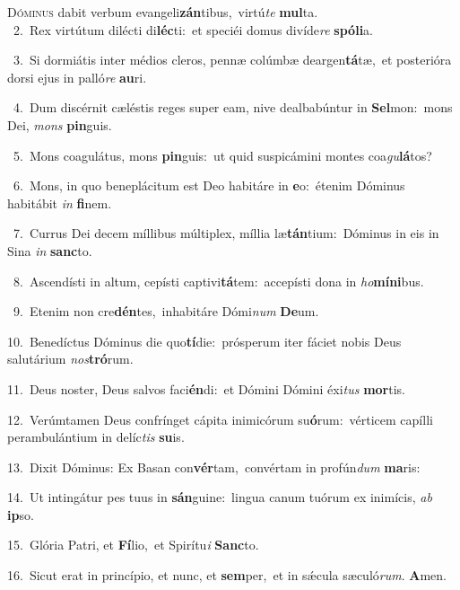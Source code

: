 \lettrine{\initial\textcolor{\initialcolor}{D}}{óminus} dabit verbum evangeli\-\textbf{zán}\-tibus,~\star virtú\textit{te} \textbf{mul}\-ta.\\
{\numbfont\textcolor{\numbcolor}{~2.}}~Rex virtútum dilécti di\-\textbf{léc}\-ti:~\star et speciéi domus divíde\textit{re} \textbf{spó}\-\textbf{li}a.\par
{\numbfont\textcolor{\numbcolor}{~3.}}~Si dormiátis inter médios cleros, pennæ colúmbæ deargen\-\textbf{tá}\-tæ,~\star et posterióra dorsi ejus in palló\textit{re} \textbf{au}\-ri.\par
{\numbfont\textcolor{\numbcolor}{~4.}}~Dum discérnit cæléstis reges super eam, nive dealbabúntur in \textbf{Sel}\-mon:~\star mons Dei, \textit{mons} \textbf{pin}\-guis.\par
{\numbfont\textcolor{\numbcolor}{~5.}}~Mons coagulátus, mons \textbf{pin}\-guis:~\star ut quid suspicámini montes coa\-\textit{gu}\-\textbf{lá}tos?\par
{\numbfont\textcolor{\numbcolor}{~6.}}~Mons, in quo beneplácitum est Deo habitáre in \textbf{e}\-o:~\star étenim Dóminus habitábit \textit{in} \textbf{fi}\-nem.\par
{\numbfont\textcolor{\numbcolor}{~7.}}~Currus Dei decem míllibus múltiplex, míllia læ\-\textbf{tán}\-tium:~\star Dóminus in eis in Sina \textit{in} \textbf{sanc}\-to.\par
{\numbfont\textcolor{\numbcolor}{~8.}}~Ascendísti in altum, cepísti captivi\-\textbf{tá}\-tem:~\star accepísti dona in \textit{ho}\-\textbf{mí}\textbf{ni}bus.\par
{\numbfont\textcolor{\numbcolor}{~9.}}~Etenim non cre\-\textbf{dén}\-tes,~\star inhabitáre Dómi\textit{num} \textbf{De}\-um.\par
{\numbfont\textcolor{\numbcolor}{10.}}~Benedíctus Dóminus die quo\-\textbf{tí}\-die:~\star prósperum iter fáciet nobis Deus salutárium \textit{nos}\-\textbf{tró}rum.\par
{\numbfont\textcolor{\numbcolor}{11.}}~Deus noster, Deus salvos faci\-\textbf{én}\-di:~\star et Dómini Dómini éxi\textit{tus} \textbf{mor}\-tis.\par
{\numbfont\textcolor{\numbcolor}{12.}}~Verúmtamen Deus confrínget cápita inimicórum su\-\textbf{ó}\-rum:~\star vérticem capílli perambulántium in delíc\textit{tis} \textbf{su}\-is.\par
{\numbfont\textcolor{\numbcolor}{13.}}~Dixit Dóminus: Ex Basan con\-\textbf{vér}\-tam,~\star convértam in profún\textit{dum} \textbf{ma}\-ris:\par
{\numbfont\textcolor{\numbcolor}{14.}}~Ut intingátur pes tuus in \textbf{sán}\-guine:~\star lingua canum tuórum ex inimícis, \textit{ab} \textbf{ip}\-so.\par
{\numbfont\textcolor{\numbcolor}{15.}}~Glória Patri, et \textbf{Fí}\-lio,~\star et Spirítu\textit{i} \textbf{Sanc}\-to.\par
{\numbfont\textcolor{\numbcolor}{16.}}~Sicut erat in princípio, et nunc, et \textbf{sem}\-per,~\star et in sǽcula sæculó\-\textit{rum}\-. \textbf{A}\-men.\par

